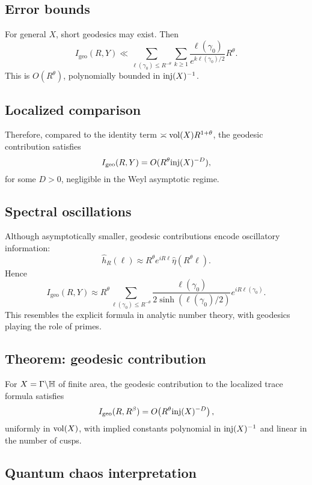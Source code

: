 \subsection{Error bounds}\label{subsec:geom-error}

For general $X$, short geodesics may exist. Then
\[
I_{\mathrm{geo}}(R,Y)\ll \sum_{\ell(\gamma_0)\le R^{-\theta}} \sum_{k\ge 1} \frac{\ell(\gamma_0)}{e^{k\ell(\gamma_0)/2}} R^\theta.
\]
This is $O(R^\theta)$, polynomially bounded in $\mathrm{inj}(X)^{-1}$.

\subsection{Localized comparison}\label{subsec:geom-compare}

Therefore, compared to the identity term $\asymp \operatorname{vol}(X)R^{1+\theta}$, the geodesic contribution satisfies
\[
I_{\mathrm{geo}}(R,Y)=O(R^\theta \mathrm{inj}(X)^{-D}),
\]
for some $D>0$, negligible in the Weyl asymptotic regime.

\subsection{Spectral oscillations}\label{subsec:geom-oscillations}

Although asymptotically smaller, geodesic contributions encode oscillatory information:
\[
\widehat{h}_R(\ell) \approx R^\theta e^{iR\ell}\hat\eta(R^\theta\ell).
\]
Hence
\[
I_{\mathrm{geo}}(R,Y)\approx R^\theta \sum_{\ell(\gamma_0)\le R^{-\theta}} \frac{\ell(\gamma_0)}{2\sinh(\ell(\gamma_0)/2)} e^{iR\ell(\gamma_0)}.
\]
This resembles the explicit formula in analytic number theory, with geodesics playing the role of primes.

\subsection{Theorem: geodesic contribution}\label{subsec:geom-thm}

\begin{theorem}
For $X=\Gamma\backslash\mathbb{H}$ of finite area, the geodesic contribution to the localized trace formula satisfies
\[
I_{\mathrm{geo}}(R,R^\beta)=O\!\left(R^\theta \mathrm{inj}(X)^{-D}\right),
\]
uniformly in $\operatorname{vol}(X)$, with implied constants polynomial in $\mathrm{inj}(X)^{-1}$ and linear in the number of cusps.
\end{theorem}

\subsection{Quantum chaos interpretation}\label{subsec:geom-quantum}

